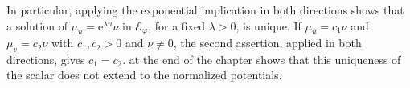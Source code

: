 In particular, applying the exponential implication in both directions shows that a solution of $\mu_u=\mathrm{e}^{\lambda u}\nu$ in $\mathcal E_\varphi$, for a fixed $\lambda>0$, is unique. If $\mu_u=c_1\nu$ and $\mu_v=c_2\nu$ with $c_1,c_2>0$ and $\nu\ne0$, the second assertion, applied in both directions, gives $c_1=c_2$.  at the end of the chapter shows that this uniqueness of the scalar does not extend to the normalized potentials.
